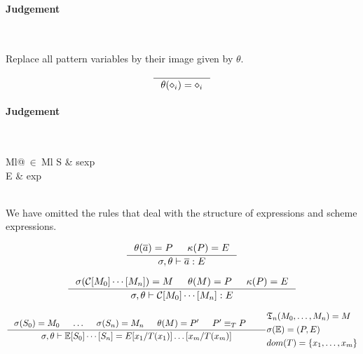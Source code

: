 \paragraph{Judgement} \\


Replace all pattern variables by their image given by $\theta$.

\[
\inference
{
}
{
  \theta(\diamond_i) = \diamond_i
}
\]


\clearpage


\paragraph{Judgement} \\
\indent\begin{tabular}{Ml@{$\ \in\ $}Ml}
  S & sexp\\
  E & exp
\end{tabular}\\

We have omitted the rules that deal with the structure of expressions and scheme
expressions.

\[
\inference
{
  \theta(\overline{a}) = P & \kappa(P) = E
}
{
  \sigma, \theta |- \overline{a} : E
}
\]

\[
\inference
{
  \sigma(\mathcal{C}[M_0]\cdots[M_n]) = M & \theta(M) = P & \kappa(P) = E
}
{
  \sigma, \theta |- \mathcal{C}[M_0]\cdots[M_n] : E
}
\]


\[
\inference
{
  \sigma(S_0) = M_0 & \ldots & \sigma(S_n) = M_n &
  \theta(M) = P' & P' \equiv_T P &
}
{
  \sigma, \theta |- \mathbb{E}[S_0]\cdots[S_n] = E[x_1/T(x_1)]\ldots[x_m/T(x_m)]
}
{
  \begin{aligned}
    & \mathfrak{T}_n(M_0, \ldots, M_n) = M\\
    & \sigma(\mathbb{E}) = (P, E)\\
    & dom(T) = \{x_1, \ldots, x_m\}
  \end{aligned}
}
\]

